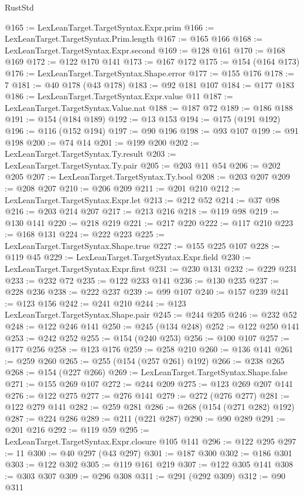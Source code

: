 \begin{lexlean}{RustStd}
\begin{coremodule}
{\begin{coremodule}
{{{{{{{{{{{{{{{{{{{{{{{{{{{{{{{{{{{{{{{{{{{{{{{@165 := LexLeanTarget.TargetSyntax.Expr.prim
@166 := LexLeanTarget.TargetSyntax.Prim.length
@167 := @165 @166
@168 := LexLeanTarget.TargetSyntax.Expr.second
@169 := @128 @161
@170 := @168 @169
@172 := @122 @170 @141
@173 := @167 @172
@175 := @154 (@164 @173)
@176 := LexLeanTarget.TargetSyntax.Shape.error
@177 := @155 @176
@178 := 7
@181 := @40 @178 (@43 @178)
@183 := @92 @181 @107
@184 := @177 @183
@186 := LexLeanTarget.TargetSyntax.Expr.value @11
@187 := LexLeanTarget.TargetSyntax.Value.nat
@188 := @187 @72
@189 := @186 @188
@191 := @154 (@184 @189)
@192 := @13 @153
@194 := @175 (@191 @192)
@196 := @116 (@152 @194)
@197 := @90 @196
@198 := @93 @107
@199 := @91 @198
@200 := @74 @14
@201 := @199 @200
@202 := LexLeanTarget.TargetSyntax.Ty.result
@203 := LexLeanTarget.TargetSyntax.Ty.pair
@205 := @203 @11 @54
@206 := @202 @205
@207 := LexLeanTarget.TargetSyntax.Ty.bool
@208 := @203 @207
@209 := @208 @207
@210 := @206 @209
@211 := @201 @210
@212 := LexLeanTarget.TargetSyntax.Expr.let
@213 := @212 @52
@214 := @37 @98
@216 := @203 @214 @207
@217 := @213 @216
@218 := @119 @98
@219 := @130 @141
@220 := @218 @219
@221 := @217 @220
@222 := @117 @210
@223 := @168 @131
@224 := @222 @223
@225 := LexLeanTarget.TargetSyntax.Shape.true
@227 := @155 @225 @107
@228 := @119 @45
@229 := LexLeanTarget.TargetSyntax.Expr.field
@230 := LexLeanTarget.TargetSyntax.Expr.first
@231 := @230 @131
@232 := @229 @231
@233 := @232 @72
@235 := @122 @233 @141
@236 := @130 @235
@237 := @228 @236
@238 := @222 @237
@239 := @99 @107
@240 := @157 @239
@241 := @123 @156
@242 := @241 @210
@244 := @123 LexLeanTarget.TargetSyntax.Shape.pair
@245 := @244 @205
@246 := @232 @52
@248 := @122 @246 @141
@250 := @245 (@134 @248)
@252 := @122 @250 @141
@253 := @242 @252
@255 := @154 (@240 @253)
@256 := @100 @107
@257 := @177 @256
@258 := @123 @176
@259 := @258 @210
@260 := @136 @141
@261 := @259 @260
@265 := @255 (@154 (@257 @261) @192)
@266 := @238 @265
@268 := @154 (@227 @266)
@269 := LexLeanTarget.TargetSyntax.Shape.false
@271 := @155 @269 @107
@272 := @244 @209
@275 := @123 @269 @207 @141
@276 := @122 @275
@277 := @276 @141
@279 := @272 (@276 @277)
@281 := @122 @279 @141
@282 := @259 @281
@286 := @268 (@154 (@271 @282) @192)
@287 := @224 @286
@289 := @211 (@221 @287)
@290 := @90 @289
@291 := @201 @216
@292 := @119 @59
@295 := LexLeanTarget.TargetSyntax.Expr.closure @105 @141
@296 := @122 @295
@297 := 11
@300 := @40 @297 (@43 @297)
@301 := @187 @300
@302 := @186 @301
@303 := @122 @302
@305 := @119 @161 @219
@307 := @122 @305 @141
@308 := @303 @307
@309 := @296 @308
@311 := @291 (@292 @309)
@312 := @90 @311
}}}}}}}}}}}}}}}}}}}}}}}}}}}}}}}}}}}}}}}}}}}}}}}
\end{coremodule}}
\end{coremodule}
\end{lexlean}
